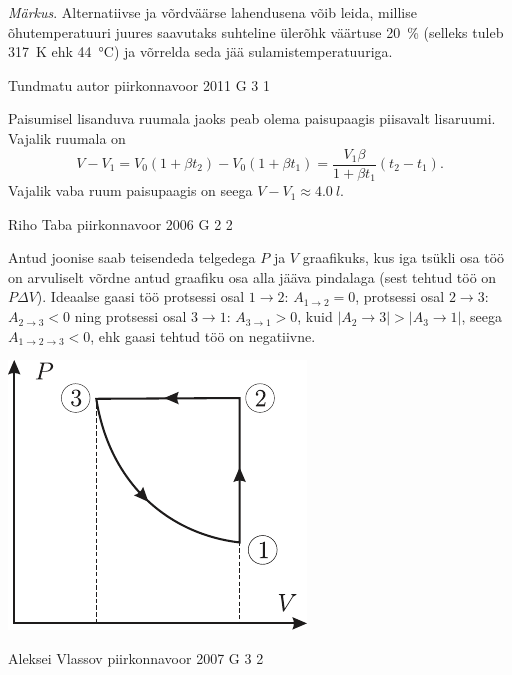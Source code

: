 \documentclass[11pt]{article}
\begin{document}
{{\emph{Märkus}. Alternatiivse ja võrdväärse lahendusena võib leida, millise õhutemperatuuri juures saavutaks suhteline ülerõhk väärtuse \SI{20}{\%} (selleks tuleb \SI{317}{K} ehk \SI{44}{\celsius}) ja võrrelda seda jää sulamistemperatuuriga.
\fi
}

{Tundmatu autor} %
{piirkonnavoor} %
{2011} %
{G 3} %
{1} %
{

\ifSolution
Paisumisel lisanduva ruumala jaoks peab olema paisupaagis piisavalt lisaruumi. Vajalik ruumala on
\[
V-V_{1}=V_{0}\left(1+\beta t_{2}\right)-V_{0}\left(1+\beta t_{1}\right)=\frac{V_{1} \beta}{1+\beta t_{1}}\left(t_{2}-t_{1}\right).
\]
Vajalik vaba ruum paisupaagis on seega $V - V_1 \approx \SI{4,0}{l}$.
\fi
}

{Riho Taba} %
{piirkonnavoor} %
{2006} %
{G 2} %
{2} %
{

\ifSolution
Antud joonise saab teisendeda telgedega $P$ ja $V$ graafikuks, kus iga tsükli osa töö on arvuliselt võrdne antud graafiku osa alla jääva pindalaga (sest tehtud töö on $P\Delta V$). Ideaalse gaasi töö protsessi osal $1 \rightarrow 2$: $A_{1\rightarrow 2} = 0$, protsessi osal $2 \rightarrow 3$: $A_{2\rightarrow 3} < 0$ ning protsessi osal $3 \rightarrow 1$: $A_{3\rightarrow 1} > 0$, kuid $|A_2\rightarrow 3| > |A_3\rightarrow 1|$, seega $A_{1\rightarrow 2\rightarrow 3} < 0$, ehk gaasi tehtud töö on negatiivne.

\begin{center}
	\includegraphics[width=0.4\linewidth]{2006-v2g-02-lah}
\end{center}
\fi
}

{Aleksei Vlassov} %
{piirkonnavoor} %
{2007} %
{G 3} %
{2} %
{

}}
\end{document}
